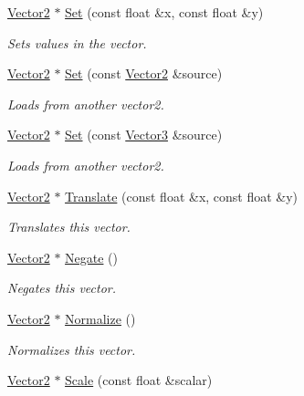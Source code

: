 \begin{DoxyCompactItemize}
\hyperlink{class_flounder_1_1_vector2}{Vector2} $\ast$ \hyperlink{class_flounder_1_1_vector2_a984b0507108bfd596d3da63afc3c17ec}{Set} (const float \&x, const float \&y)
\begin{DoxyCompactList}\small\item\em Sets values in the vector. \end{DoxyCompactList}\item 
\hyperlink{class_flounder_1_1_vector2}{Vector2} $\ast$ \hyperlink{class_flounder_1_1_vector2_ad2169829919d5666d689384e6881cbd0}{Set} (const \hyperlink{class_flounder_1_1_vector2}{Vector2} \&source)
\begin{DoxyCompactList}\small\item\em Loads from another vector2. \end{DoxyCompactList}\item 
\hyperlink{class_flounder_1_1_vector2}{Vector2} $\ast$ \hyperlink{class_flounder_1_1_vector2_ac7556748d81349995a85a9c9b7d88c1c}{Set} (const \hyperlink{class_flounder_1_1_vector3}{Vector3} \&source)
\begin{DoxyCompactList}\small\item\em Loads from another vector2. \end{DoxyCompactList}\item 
\hyperlink{class_flounder_1_1_vector2}{Vector2} $\ast$ \hyperlink{class_flounder_1_1_vector2_a4b98f6df01e1c4835908369a38982085}{Translate} (const float \&x, const float \&y)
\begin{DoxyCompactList}\small\item\em Translates this vector. \end{DoxyCompactList}\item 
\hyperlink{class_flounder_1_1_vector2}{Vector2} $\ast$ \hyperlink{class_flounder_1_1_vector2_a1822df39dd87d89831ccf9b0d264607a}{Negate} ()
\begin{DoxyCompactList}\small\item\em Negates this vector. \end{DoxyCompactList}\item 
\hyperlink{class_flounder_1_1_vector2}{Vector2} $\ast$ \hyperlink{class_flounder_1_1_vector2_a2d255dbc61b16175686b321a39d7df80}{Normalize} ()
\begin{DoxyCompactList}\small\item\em Normalizes this vector. \end{DoxyCompactList}\item 
\hyperlink{class_flounder_1_1_vector2}{Vector2} $\ast$ \hyperlink{class_flounder_1_1_vector2_a0245e7fac5276ca742b58357bb4145b9}{Scale} (const float \&scalar)

\end{DoxyCompactItemize}
